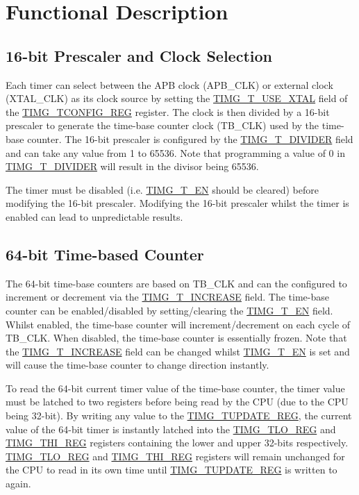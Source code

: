 \documentclass[main\_\_EN.tex]{subfiles}
\begin{document}
\newpage
\section{Functional Description}

\subsection{16-bit Prescaler and Clock Selection}

Each timer can select between the APB clock (APB\_CLK) or external clock (XTAL\_CLK) as its clock source by setting the \hyperref[fielddesc:TIMGTXUSEXTAL]{TIMG\_T\_USE\_XTAL} field of the \hyperref[regdesc:TIMGTXCONFIGREG]{TIMG\_TCONFIG\_REG} register. The clock is then divided by a 16-bit prescaler to generate the time-base counter clock (TB\_CLK) used by the time-base counter. The 16-bit prescaler is configured by the \hyperref[fielddesc:TIMGTXDIVIDER]{TIMG\_T\_DIVIDER} field and can take any value from 1 to 65536. Note that programming a value of 0 in \hyperref[fielddesc:TIMGTXDIVIDER]{TIMG\_T\_DIVIDER} will result in the divisor being 65536.

The timer must be disabled (i.e. \hyperref[fielddesc:TIMGTXEN]{TIMG\_T\_EN} should be cleared) before modifying the 16-bit prescaler. Modifying the 16-bit prescaler whilst the timer is enabled can lead to unpredictable results.

\subsection{64-bit Time-based Counter}
The 64-bit time-base counters are based on TB\_CLK and can the configured to increment or decrement via the \hyperref[fielddesc:TIMGTXINCREASE]{TIMG\_T\_INCREASE} field. The time-base counter can be enabled/disabled by setting/clearing the \hyperref[fielddesc:TIMGTXEN]{TIMG\_T\_EN} field. Whilst enabled, the time-base counter will increment/decrement on each cycle of TB\_CLK. When disabled, the time-base counter is essentially frozen. Note that the \hyperref[fielddesc:TIMGTXINCREASE]{TIMG\_T\_INCREASE} field can be changed whilst \hyperref[fielddesc:TIMGTXEN]{TIMG\_T\_EN} is set and will cause the time-base counter to change direction instantly.

To read the 64-bit current timer value of the time-base counter, the timer value must be latched to two registers before being read by the CPU (due to the CPU being 32-bit). By writing any value to the \hyperref[regdesc:TIMGTXUPDATEREG]{TIMG\_TUPDATE\_REG}, the current value of the 64-bit timer is instantly latched into the \hyperref[regdesc:TIMGTXLOREG]{TIMG\_TLO\_REG} and \hyperref[regdesc:TIMGTXHIREG]{TIMG\_THI\_REG} registers containing the lower and upper 32-bits respectively. \hyperref[regdesc:TIMGTXLOREG]{TIMG\_TLO\_REG} and \hyperref[regdesc:TIMGTXHIREG]{TIMG\_THI\_REG} registers will remain unchanged for the CPU to read in its own time until \hyperref[regdesc:TIMGTXUPDATEREG]{TIMG\_TUPDATE\_REG} is written to again.
\end{document}

